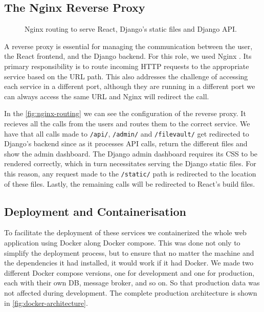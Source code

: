 \subsection{The Nginx Reverse Proxy}

\begin{figure}[htbp]
    \centering
    
    \caption{Nginx routing to serve React, Django's static files and Django API.}
    \label{fig:nginx-routing}
\end{figure}

A reverse proxy is essential for managing the communication between
the user, the React frontend, and the Django backend.
For this role, we used Nginx \autocite{Nginx}.
Its primary responsibility is to route incoming HTTP requests to the appropriate service based on the URL path.
This also addresses the challenge of accessing each service in a different port,
although they are running in a different port
we can always access the same URL and Nginx will redirect the call.

In the \autoref{fig:nginx-routing}
we can see the configuration of the reverse proxy.
It recieves all the calls from the users and routes them to the correct service.
We have that all calls made to \texttt{/api/}, \texttt{/admin/} and \texttt{/filevault/}
get redirected to Django's backend since as it processes \ac{API} calls,
return the different files and show the admin dashboard.
The Django admin dashboard requires its CSS to be rendered correctly,
which in turn necessitates serving the Django static files.
For this reason, any request made to the \texttt{/static/} path
is redirected to the location of these files.
Lastly, the remaining calls will be redirected to React's build files.

\subsection{Deployment and Containerisation}



To facilitate the deployment of these services
we containerized the whole web application using Docker \autocite{merkelDockerLightweightLinux2014} along Docker compose.
This was done not only to simplify the deployment process,
but to ensure that no matter the machine and the dependencies it had installed,
it would work if it had Docker.
We made two different Docker compose versions, one for development and one for production,
each with their own \ac{DB}, message broker, and so on.
So that production data was not affected during development.
The complete production architecture is shown in \autoref{fig:docker-architecture}.

